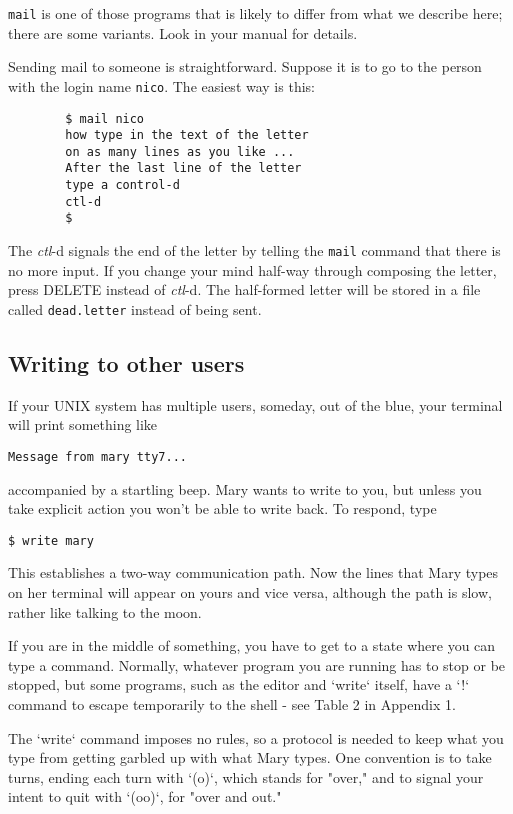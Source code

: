 \texttt{mail} is one of those programs that is likely to differ from what we
describe here; there are some variants. Look in your manual for details.

Sending mail to someone is straightforward. Suppose it is to go to the person
with the login name \texttt{nico}. The easiest way is this:
\begin{verbatim}
        $ mail nico
        how type in the text of the letter
        on as many lines as you like ...
        After the last line of the letter
        type a control-d
        ctl-d
        $
\end{verbatim}
The \textit{ctl}-d signals the end of the letter by telling the \texttt{mail}
command that there is no more input. If you change your mind half-way through
composing the letter, press DELETE instead of \textit{ctl}-d. The half-formed
letter will be stored in a file called \texttt{dead.letter} instead of being
sent.


\subsection{Writing to other users}
If your UNIX system has multiple users, someday, out of the blue, your terminal will print something like

\begin{verbatim}
Message from mary tty7...
\end{verbatim}

accompanied by a startling beep.
Mary wants to write to you, but unless you take explicit action you won't be able to write back.
To respond, type

\begin{verbatim}
$ write mary
\end{verbatim}

This establishes a two-way communication path.
Now the lines that Mary types on her terminal will appear on yours and vice versa, although the path is slow, rather like talking to the moon.

If you are in the middle of something, you have to get to a state where you can type a command.
Normally, whatever program you are running has to stop or be stopped, but some programs, such as the editor and `write` itself, have a `!` command to escape temporarily to the shell - see Table 2 in Appendix 1.

The `write` command imposes no rules, so a protocol is needed to keep what you type from getting garbled up with what Mary types.
One convention is to take turns, ending each turn with `(o)`, which stands for "over," and to signal your intent to quit with `(oo)`, for "over and out."

